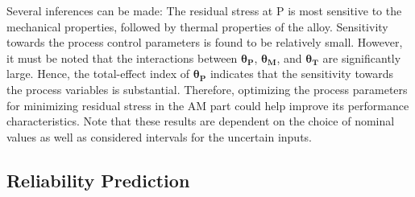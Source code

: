 %
Several inferences can be made: The residual stress at P is most sensitive to the mechanical properties, followed 
by thermal properties of the alloy. Sensitivity towards the process control parameters is found to be relatively small. 
However, it must be noted that the interactions between $\bm{\theta_P}$, $\bm{\theta_M}$, and $\bm{\theta_T}$
are significantly large. Hence, the total-effect index of $\bm{\theta_P}$ indicates that the sensitivity towards the 
process variables is substantial. Therefore, optimizing the process parameters for minimizing residual
stress in the AM part could help improve its performance characteristics. 
Note that these results are dependent on the choice of nominal values as well as considered intervals
for the uncertain inputs. 

\subsection{Reliability Prediction}
\label{sub:reliability}

